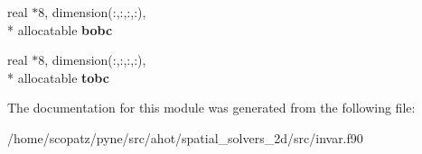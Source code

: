 \begin{DoxyCompactItemize}
\item 
\hypertarget{classinvar_ac88ff3a97a0eccbee288774e812dce01}{real $\ast$8, dimension(\-:,\-:,\-:,\-:), \\*
allocatable {\bfseries bobc}}\label{classinvar_ac88ff3a97a0eccbee288774e812dce01}

\item 
\hypertarget{classinvar_ae61fcd8c1e76af2c5a1700a1beea040e}{real $\ast$8, dimension(\-:,\-:,\-:,\-:), \\*
allocatable {\bfseries tobc}}\label{classinvar_ae61fcd8c1e76af2c5a1700a1beea040e}

\end{DoxyCompactItemize}


The documentation for this module was generated from the following file\-:\begin{DoxyCompactItemize}
\item 
/home/scopatz/pyne/src/ahot/spatial\-\_\-solvers\-\_\-2d/src/invar.\-f90\end{DoxyCompactItemize}
